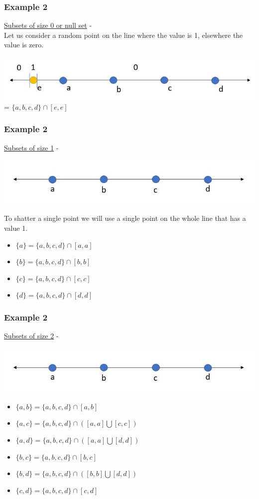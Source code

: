 \documentclass{beamer}
\begin{document}
\begin{frame}
\frametitle{Example 2}
\underline{Subsets of size 0 or null set} -\\
Let us consider a random point on the line where the value is 1, elsewhere the value is zero.
\begin{center}
    \includegraphics[scale=0.5]{figures/Capture9.JPG}
    \emptyset = $\{a,b,c,d\}\cap[e,e]$
\end{center}
\end{frame}

\begin{frame}
\frametitle{Example 2}
\underline{Subsets of size 1} -\\
\begin{center}
    \includegraphics[scale=0.5]{figures/Capture7.JPG}
\end{center}
To shatter a single point we will use a single point on the whole line that has a value 1.
\begin{itemize}
    \item $\{a\}= \{a,b,c,d\}\cap[a,a]$
    \item $\{b\}= \{a,b,c,d\}\cap[b,b]$
    \item $\{c\}= \{a,b,c,d\}\cap[c,c]$
    \item $\{d\}= \{a,b,c,d\}\cap[d,d]$
\end{itemize}
\end{frame}

\begin{frame}
\frametitle{Example 2}
\underline{Subsets of size 2} -\\
\begin{center}
    \includegraphics[scale=0.5]{figures/Capture7.JPG}
\end{center}
\begin{itemize}
    \item $\{a,b\}= \{a,b,c,d\}\cap[a,b]$
    \item $\{a,c\}= \{a,b,c,d\}\cap([a,a]\bigcup[c,c])$
    \item $\{a,d\}= \{a,b,c,d\}\cap([a,a]\bigcup[d,d])$
    \item $\{b,c\}= \{a,b,c,d\}\cap[b,c]$
    \item $\{b,d\}= \{a,b,c,d\}\cap([b,b]\bigcup[d,d])$
    \item $\{c,d\}= \{a,b,c,d\}\cap[c,d]$
\end{itemize}
\end{frame}
\end{document}

